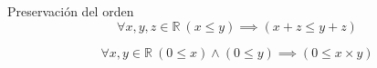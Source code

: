 \begin{axiom} \label{real_ops_order}
	Preservación del orden 
	\begin{equation} \label{eq_real_sum_order}
		\forall x,y,z \in \mathbb{R}\ (x \leq y) \implies (x + z \leq y + z)
	\end{equation}

	\begin{equation} \label{eq_real_mul_order}
		\forall x,y \in \mathbb{R}\ (0 \leq x) \land (0 \leq y) \implies (0 \leq x \times y)
	\end{equation}
\end{axiom}
